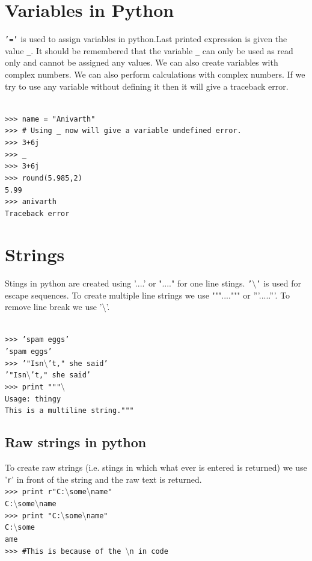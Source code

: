 \documentclass[12pt,a4paper]{article}
\begin{document}
\section{Variables in Python}
\texttt{'='} is used to assign variables in python.Last printed expression is given the value \texttt{\_}. It should be remembered that the variable \texttt{\_} can only be used as read only and cannot be assigned any values. We can also create variables with complex numbers. We can also perform calculations with complex numbers. If we try to use any variable without defining it then it will give a traceback error. 


\texttt{
\\
>>> name = "Anivarth"\\
>>> \# Using \_ now will give a variable undefined error.\\
>>> 3+6j\\
>>> \_\\
>>> 3+6j\\
>>> round(5.985,2)\\
5.99\\
>>> anivarth\\
Traceback error}



\section{Strings}
Stings in python are created using '....' or "...." for one line stings. \texttt{'$\setminus$'} is used for escape sequences. To create multiple line strings we use """....""" or '''.....'''. To remove line break we use '$\setminus$'.

\texttt{\\
>>> 'spam eggs'\\
'spam eggs'\\
>>> '"Isn$\setminus$'t," she said'\\
'"Isn$\setminus$'t," she said'\\
>>> print """$\setminus$\\
Usage: thingy \\
This is a multiline string."""}
\subsection{Raw strings in python}
To create raw strings (i.e. stings in which what ever is entered is returned) we use '\texttt{r}' in front of the string and the raw text is returned.
\texttt{\\
>>> print r"C:$\setminus$some$\setminus$name"\\
C:$\setminus$some$\setminus$name\\ 
>>> print "C:$\setminus$some$\setminus$name"\\
C:$\setminus$some\\
ame\\
>>> \#This is because of the $\setminus$n in code \\
}
\end{document}
